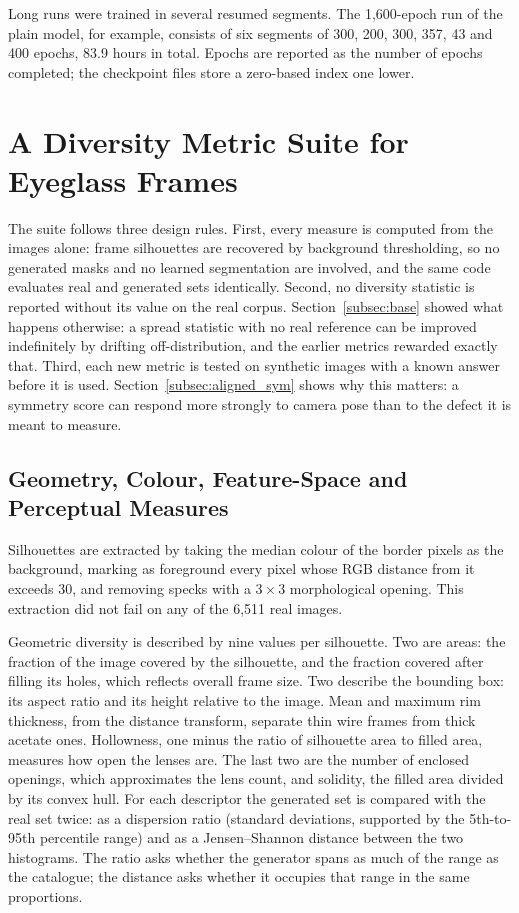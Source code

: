 \documentclass[electronics,article,submit,pdftex,moreauthors]{Definitions/mdpi}
\begin{document}
Long runs were trained in several resumed segments. The 1,600-epoch run of the plain model, for example, consists of six segments of 300, 200, 300, 357, 43 and 400
epochs, 83.9 hours in total. Epochs are reported as the number of epochs
completed; the checkpoint files store a zero-based index one lower.

\section{A Diversity Metric Suite for Eyeglass Frames}
\label{sec:metrics}

The suite follows three design rules. First, every measure is computed
from the images alone: frame silhouettes are recovered by background
thresholding, so no generated masks and no learned segmentation are
involved, and the same code evaluates real and generated sets identically.
Second, no diversity statistic is reported without its value on the real
corpus. Section~\ref{subsec:base} showed what happens otherwise: a spread
statistic with no real reference can be improved indefinitely by drifting
off-distribution, and the earlier metrics rewarded exactly that.
Third, each new metric is tested on synthetic images with a known answer
before it is used. Section~\ref{subsec:aligned_sym} shows why this matters:
a symmetry score can respond more strongly to camera pose than to the defect
it is meant to measure.

\subsection{Geometry, Colour, Feature-Space and Perceptual Measures}
\label{subsec:metric_families}

Silhouettes are extracted by taking the median colour of the border pixels
as the background, marking as foreground every pixel whose RGB distance from
it exceeds 30, and removing specks with a $3 \times 3$ morphological opening.
This extraction did not fail on any of the 6,511 real images.

Geometric diversity is described by nine values per silhouette. Two are
areas: the fraction of the image covered by the silhouette, and the fraction
covered after filling its holes, which reflects overall frame size. Two
describe the bounding box: its aspect ratio and its height relative to the
image. Mean and maximum rim thickness, from the distance transform, separate
thin wire frames from thick acetate ones. Hollowness, one minus the ratio of
silhouette area to filled area, measures how open the lenses are. The last
two are the number of enclosed openings, which approximates the lens count,
and solidity, the filled area divided by its convex hull. For each descriptor the generated
set is compared with the real set twice: as a dispersion ratio (standard
deviations, supported by the 5th-to-95th percentile range) and as a
Jensen--Shannon distance between the two histograms. The ratio asks
whether the generator spans as much of the range as the catalogue; the
distance asks whether it occupies that range in the same proportions.
\end{document}
